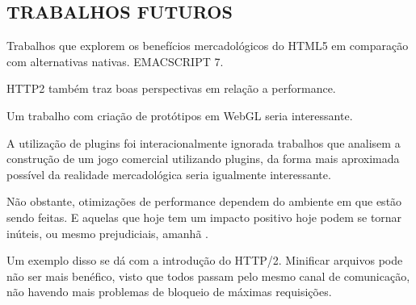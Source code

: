 \begin{draft}
\subsection{TRABALHOS FUTUROS}

Trabalhos que explorem os benefícios mercadológicos do HTML5 em comparação com alternativas nativas.
EMACSCRIPT 7.

HTTP2 também traz boas perspectivas em relação a performance.

Um trabalho com criação de protótipos em WebGL seria interessante.

A utilização de plugins foi interacionalmente ignorada trabalhos
que analisem a construção de um jogo comercial utilizando plugins,
da forma mais aproximada possível da realidade mercadológica seria
igualmente interessante.

Não obstante, otimizações de performance dependem do ambiente em
que estão sendo feitas. E aquelas que hoje tem um impacto positivo
hoje podem se tornar inúteis, ou mesmo prejudiciais, amanhã
\autocite[pp.131]{html5mostwanted}.

Um exemplo disso se dá com a introdução do HTTP/2. Minificar arquivos
pode não ser mais benéfico, visto que todos passam pelo mesmo canal
de comunicação, não havendo mais problemas de bloqueio de máximas
requisições.

\end{draft}
